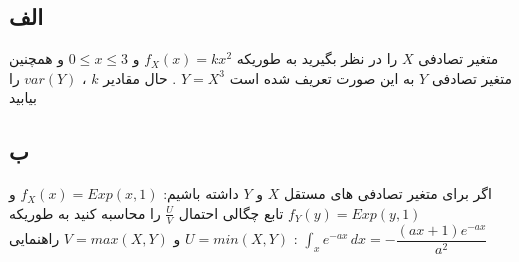 
\subsection*{الف}
متغیر تصادفی $X$ را در نظر بگیرید به طوریکه 
$ f_X(x) = kx^2 $
 و
$ 0 \leq x \leq 3$
 و همچنین متغیر تصادفی $Y$ به این صورت تعریف شده است 
$Y = X^3$
 . حال مقادیر $k$ ، $var(Y)$  را بیابید 

\subsection*{ب}
اگر برای متغیر تصادفی های مستقل  $X$ و $Y$  داشته باشیم: 
$
f_X(x) = Exp(x, 1)
$
و
$
f_Y(y) = Exp(y, 1)
$
تابع چگالی احتمال 
$ \frac{U}{V}$
 را محاسبه کنید به طوریکه 
$U = min(X, Y)$
و
$V = max(X, Y)$
راهنمایی : 
$
\int_xe^{-ax}\, dx = -\dfrac{(ax+1)e^{-ax}}{a^2}
$
